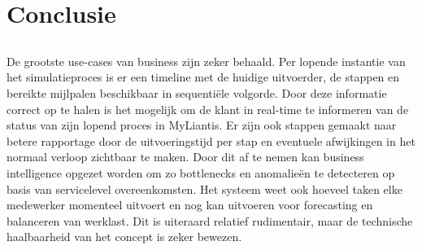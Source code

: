 
\chapter{Conclusie}%
\label{ch:conclusie}

\section{}%
\label{sec:resultaten}
\subsection{}%
\label{subsec:functionele vereisten}
\subsubsection{}%
\label{subsubsec:monitoring}
De grootste use-cases van business zijn zeker behaald. Per lopende instantie van het simulatieproces is er een timeline met de huidige uitvoerder, de stappen en bereikte mijlpalen beschikbaar in sequentiële volgorde. Door deze informatie correct op te halen is het mogelijk om de klant in real-time te informeren van de status van zijn lopend proces in MyLiantis. Er zijn ook stappen gemaakt naar betere rapportage door de uitvoeringstijd per stap en eventuele afwijkingen in het normaal verloop zichtbaar te maken. Door dit af te nemen kan business intelligence opgezet worden om zo bottlenecks en anomalieën te detecteren op basis van servicelevel overeenkomsten. Het systeem weet ook hoeveel taken elke medewerker momenteel uitvoert en nog kan uitvoeren voor forecasting en balanceren van werklast. Dit is uiteraard relatief rudimentair, maar de technische haalbaarheid van het concept is zeker bewezen.
